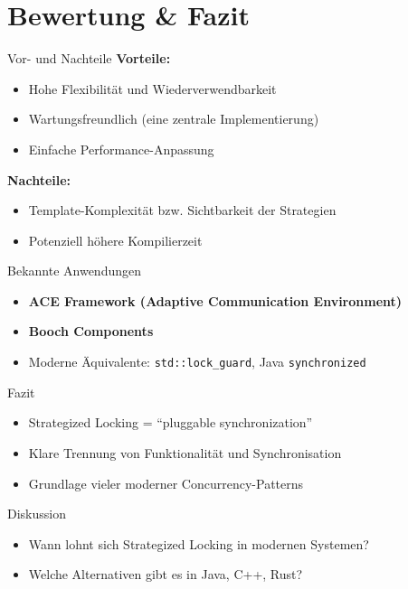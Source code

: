 \documentclass[aspectratio=169,10pt]{beamer}
\begin{document}
\section{Bewertung \& Fazit}
\begin{frame}{Vor- und Nachteile}
  \textbf{Vorteile:}
  \begin{itemize}
    \item Hohe Flexibilit\"at und Wiederverwendbarkeit
    \item Wartungsfreundlich (eine zentrale Implementierung)
    \item Einfache Performance-Anpassung
  \end{itemize}
  \vspace{1em}
  \textbf{Nachteile:}
  \begin{itemize}
    \item Template-Komplexit\"at bzw. Sichtbarkeit der Strategien
    \item Potenziell h\"ohere Kompilierzeit
  \end{itemize}
\end{frame}

\begin{frame}{Bekannte Anwendungen}
  \begin{itemize}
    \item \textbf{ACE Framework (Adaptive Communication Environment)}
    \item \textbf{Booch Components}
    \item Moderne \"Aquivalente: \texttt{std::lock\_guard}, Java \texttt{synchronized}
  \end{itemize}
\end{frame}

\begin{frame}{Fazit}
  \begin{itemize}
    \item Strategized Locking = ``pluggable synchronization''
    \item Klare Trennung von Funktionalit\"at und Synchronisation
    \item Grundlage vieler moderner Concurrency-Patterns
  \end{itemize}
\end{frame}

\begin{frame}{Diskussion}
  \begin{itemize}
    \item Wann lohnt sich Strategized Locking in modernen Systemen?
    \item Welche Alternativen gibt es in Java, C++, Rust?
  \end{itemize}
\end{frame}
\end{document}
